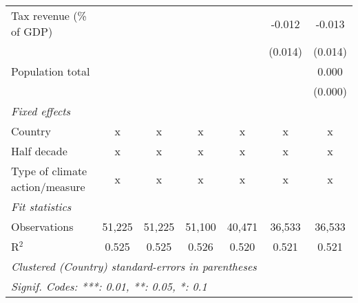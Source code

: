 \begin{tabular}{lcccccc}
   Tax revenue (\% of GDP)               &              &              &               &               & -0.012        & -0.013\\   
                                         &              &              &               &               & (0.014)       & (0.014)\\   
   Population total                      &              &              &               &               &               & 0.000\\   
                                         &              &              &               &               &               & (0.000)\\   
   \emph{Fixed effects}\\
   Country                               & x            & x            & x             & x             & x             & x\\  
   Half decade                           & x            & x            & x             & x             & x             & x\\  
   Type of climate action/measure        & x            & x            & x             & x             & x             & x\\  
   \midrule \emph{Fit statistics}\\
   Observations                          & 51,225       & 51,225       & 51,100        & 40,471        & 36,533        & 36,533\\  
   R$^2$                                 & 0.525        & 0.525        & 0.526         & 0.520         & 0.521         & 0.521\\  
   \midrule
   \multicolumn{7}{l}{\emph{Clustered (Country) standard-errors in parentheses}}\\
   \multicolumn{7}{l}{\emph{Signif. Codes: ***: 0.01, **: 0.05, *: 0.1}}\\
\end{tabular}
\par\endgroup


